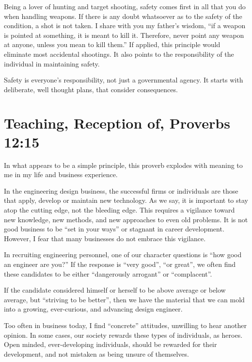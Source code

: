 \documentclass[12pt]{memoir}
\begin{document}
Being a lover of hunting and target shooting, safety comes first in all that you do when handling weapons. If there is any doubt whatsoever as to the safety of the condition, a shot is not taken. I share with you my father's wisdom, ``if a weapon is pointed at something, it is meant to kill it. Therefore, never point any weapon at anyone, unless you mean to kill them.'' If applied, this principle would eliminate most accidental shootings. It also points to the responsibility of the individual in maintaining safety.

Safety is everyone's responsibility, not just a governmental agency.
It starts with deliberate, well thought plans, that consider consequences.

\section[Teaching, Reception of]{Teaching, Reception of, Proverbs 12:15}

In what appears to be a simple principle, this proverb explodes with
meaning to me in my life and business experience.

In the engineering design business, the successful firms or individuals are those that apply, develop or maintain new technology. As we say,
it is important to stay atop the cutting edge, not the bleeding edge. This requires a vigilance toward new knowledge, new methods, and new approaches to even old problems. It is not good business to
be ``set in your ways'' or stagnant in career development. However,
I fear that many businesses do not embrace this vigilance.

In recruiting engineering personnel, one of our character questions
is ``how good an engineer are you?'' If the response is ``very
good'', ``or great'', we often find these candidates to be either
``dangerously arrogant'' or ``complacent''.

If the candidate considered himself or herself to be above average
or below average, but ``striving to be better'', then we have the
material that we can mold into a growing, ever-curious, and advancing
design engineer.

Too often in business today, I find ``concrete'' attitudes, unwilling
to hear another opinion. In some cases, our society rewards these
types of individuals, as heroes. Open minded, ever-developing individuals,
should be rewarded for their development, and not mistaken as being
unsure of themselves.
\end{document}
